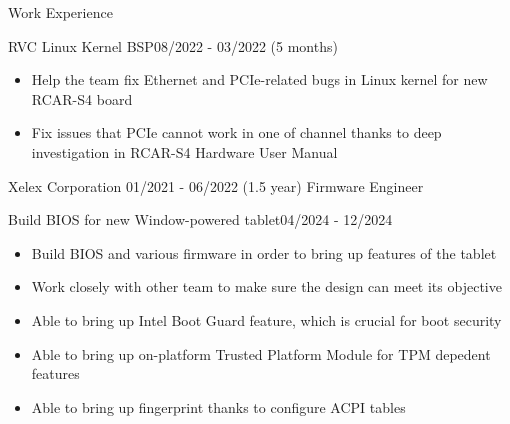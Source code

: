 \documentclass{resume} %
\begin{document}
\begin{rSection}{Work Experience}
\begin{rCompanySubsection}
        \begin{rProjectSubsubsectionV2}{RVC Linux Kernel BSP}{08/2022 - 03/2022 (5 months)} {
        }{
            \begin{itemize}
                \item Help the team fix Ethernet and PCIe-related bugs in Linux kernel for new RCAR-S4 board
            \end{itemize}
        }{
            \begin{itemize}
                \item Fix issues that PCIe cannot work in one of channel thanks to deep investigation in RCAR-S4 Hardware User Manual
            \end{itemize}
        }
        \end{rProjectSubsubsectionV2}
    \end{rCompanySubsection}
    \begin{rCompanySubsection}{Xelex Corporation}
        {01/2021 - 06/2022 (1.5 year)}
        {Firmware Engineer}
        {}
        \begin{rProjectSubsubsectionV2}{Build BIOS for new Window-powered tablet}{04/2024 - 12/2024}{
            \begin{itemize}
                \item Build BIOS and various firmware in order to bring up features of the tablet
                \item Work closely with other team to make sure the design can meet its objective
            \end{itemize}
        }{
            \begin{itemize}
                \item Able to bring up Intel Boot Guard feature, which is crucial for boot security
                \item Able to bring up on-platform Trusted Platform Module for TPM depedent features
                \item Able to bring up fingerprint thanks to configure ACPI tables
            \end{itemize}
        }
        \end{rProjectSubsubsectionV2}
    \end{rCompanySubsection}


\end{rSection}
\end{document}
